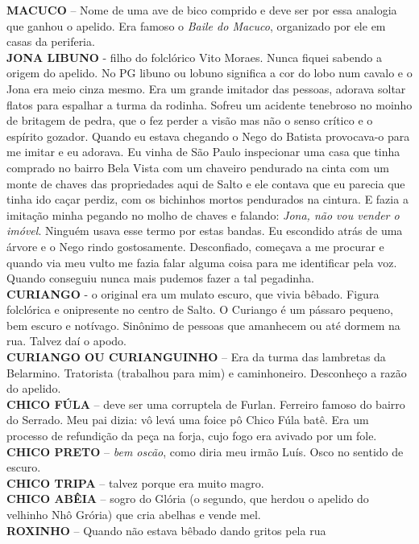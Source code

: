 \documentclass[12pt,brazil,]{book}
\begin{document}
\textbf{MACUCO} -- Nome de uma ave de bico comprido e deve ser por essa
analogia que ganhou o apelido. Era famoso o \emph{Baile do Macuco},
organizado por ele em casas da periferia.\\
\textbf{JONA LIBUNO} - filho do folclórico Vito Moraes. Nunca fiquei
sabendo a origem do apelido. No PG libuno ou lobuno significa a cor do
lobo num cavalo e o Jona era meio cinza mesmo. Era um grande imitador
das pessoas, adorava soltar flatos para espalhar a turma da rodinha.
Sofreu um acidente tenebroso no moinho de britagem de pedra, que o fez
perder a visão mas não o senso crítico e o espírito gozador. Quando eu
estava chegando o Nego do Batista provocava-o para me imitar e eu
adorava. Eu vinha de São Paulo inspecionar uma casa que tinha comprado
no bairro Bela Vista com um chaveiro pendurado na cinta com um monte de
chaves das propriedades aqui de Salto e ele contava que eu parecia que
tinha ido caçar perdiz, com os bichinhos mortos pendurados na cintura. E
fazia a imitação minha pegando no molho de chaves e falando: \emph{Jona,
não vou vender o imóvel}. Ninguém usava esse termo por estas bandas. Eu
escondido atrás de uma árvore e o Nego rindo gostosamente. Desconfiado,
começava a me procurar e quando via meu vulto me fazia falar alguma
coisa para me identificar pela voz. Quando conseguiu nunca mais pudemos
fazer a tal pegadinha.\\
\textbf{CURIANGO} - o original era um mulato escuro, que vivia bêbado.
Figura folclórica e onipresente no centro de Salto. O Curiango é um
pássaro pequeno, bem escuro e notívago. Sinônimo de pessoas que
amanhecem ou até dormem na rua. Talvez daí o apodo.\\
\textbf{CURIANGO OU CURIANGUINHO} -- Era da turma das lambretas da
Belarmino. Tratorista (trabalhou para mim) e caminhoneiro. Desconheço a
razão do apelido.\\
\textbf{CHICO FÚLA} -- deve ser uma corruptela de Furlan. Ferreiro
famoso do bairro do Serrado. Meu pai dizia: vô levá uma foice pô Chico
Fúla batê. Era um processo de refundição da peça na forja, cujo fogo era
avivado por um fole.\\
\textbf{CHICO PRETO} -- \emph{bem oscão}, como diria meu irmão Luís.
Osco no sentido de escuro.\\
\textbf{CHICO TRIPA} -- talvez porque era muito magro.\\
\textbf{CHICO ABÊIA} -- sogro do Glória (o segundo, que herdou o apelido
do velhinho Nhô Grória) que cria abelhas e vende mel.\\
\textbf{ROXINHO} -- Quando não estava bêbado dando gritos pela rua
\end{document}

